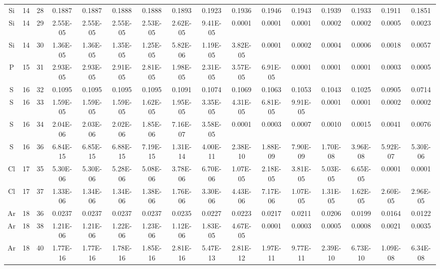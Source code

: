 {\begin{tabular}{|c|c|c|c|c|c|c|c|c|c|c|c|c|c|c|c|}
Si & 14 & 28  & 0.1887   & 0.1887   & 0.1888   & 0.1888   & 0.1893   & 0.1923   & 0.1936   & 0.1946   & 0.1943   & 0.1939   & 0.1933   & 0.1911   & 0.1851   \\
Si & 14 & 29  & 2.55E-05 & 2.55E-05 & 2.55E-05 & 2.53E-05 & 2.62E-05 & 9.41E-05 & 0.0001   & 0.0001   & 0.0001   & 0.0002   & 0.0002   & 0.0005   & 0.0023   \\
Si & 14 & 30  & 1.36E-05 & 1.36E-05 & 1.35E-05 & 1.25E-05 & 5.82E-06 & 1.19E-05 & 3.82E-05 & 0.0001   & 0.0002   & 0.0004   & 0.0006   & 0.0018   & 0.0057   \\
P  & 15 & 31  & 2.93E-05 & 2.93E-05 & 2.91E-05 & 2.81E-05 & 1.98E-05 & 2.31E-05 & 3.57E-05 & 6.91E-05 & 0.0001   & 0.0001   & 0.0001   & 0.0003   & 0.0005   \\
S  & 16 & 32  & 0.1095   & 0.1095   & 0.1095   & 0.1095   & 0.1091   & 0.1074   & 0.1069   & 0.1063   & 0.1053   & 0.1043   & 0.1025   & 0.0905   & 0.0714   \\
S  & 16 & 33  & 1.59E-05 & 1.59E-05 & 1.59E-05 & 1.62E-05 & 1.95E-05 & 3.35E-05 & 4.31E-05 & 6.81E-05 & 9.91E-05 & 0.0001   & 0.0001   & 0.0002   & 0.0002   \\
S  & 16 & 34  & 2.04E-06 & 2.03E-06 & 2.02E-06 & 1.85E-06 & 7.16E-07 & 3.58E-05 & 0.0001   & 0.0003   & 0.0007   & 0.0010   & 0.0015   & 0.0041   & 0.0076   \\
S  & 16 & 36  & 6.84E-15 & 6.85E-15 & 6.88E-15 & 7.19E-15 & 1.31E-14 & 4.00E-11 & 2.38E-10 & 1.88E-09 & 7.90E-09 & 1.70E-08 & 3.96E-08 & 5.92E-07 & 5.30E-06 \\
Cl & 17 & 35  & 5.30E-06 & 5.30E-06 & 5.28E-06 & 5.08E-06 & 3.78E-06 & 6.70E-06 & 1.07E-05 & 2.18E-05 & 3.81E-05 & 5.03E-05 & 6.65E-05 & 0.0001   & 0.0001   \\
Cl & 17 & 37  & 1.33E-06 & 1.34E-06 & 1.34E-06 & 1.38E-06 & 1.76E-06 & 3.30E-06 & 4.43E-06 & 7.17E-06 & 1.07E-05 & 1.31E-05 & 1.62E-05 & 2.60E-05 & 2.96E-05 \\
Ar & 18 & 36  & 0.0237   & 0.0237   & 0.0237   & 0.0237   & 0.0235   & 0.0227   & 0.0223   & 0.0217   & 0.0211   & 0.0206   & 0.0199   & 0.0164   & 0.0122   \\
Ar & 18 & 38  & 1.21E-06 & 1.21E-06 & 1.22E-06 & 1.23E-06 & 1.12E-06 & 1.83E-05 & 4.67E-05 & 0.0001   & 0.0003   & 0.0005   & 0.0008   & 0.0021   & 0.0035   \\
Ar & 18 & 40  & 1.77E-16 & 1.77E-16 & 1.78E-16 & 1.85E-16 & 2.81E-16 & 5.47E-13 & 2.81E-12 & 1.97E-11 & 9.77E-11 & 2.39E-10 & 6.73E-10 & 1.09E-08 & 6.34E-08 \\

\end{tabular}}
